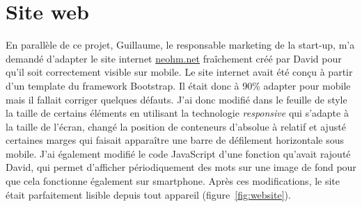 \documentclass[a4paper, 12pt, sffamily]{report}
\begin{document}
\section{Site web}
En parallèle de ce projet, Guillaume, le responsable marketing de la start-up, m’a demandé d’adapter le site internet \url{neohm.net} fraîchement créé par David pour qu’il soit correctement visible sur mobile.
Le site internet avait été conçu à partir d’un template du framework Bootstrap. Il était donc à 90\% adapter pour mobile mais il fallait corriger quelques défauts. J'ai donc modifié dans le feuille de style la taille de certains éléments en utilisant la technologie \emph{responsive} qui s’adapte à la taille de l’écran, changé la position de conteneurs d’absolue à relatif et ajusté certaines marges qui faisait apparaître une barre de défilement horizontale sous mobile. J’ai également modifié le code JavaScript d’une fonction qu’avait rajouté David, qui permet d’afficher périodiquement des mots sur une image de fond pour que cela fonctionne également sur smartphone. Après ces modifications, le site était parfaitement lisible depuis tout appareil (figure~\ref{fig:website}).
\end{document}
